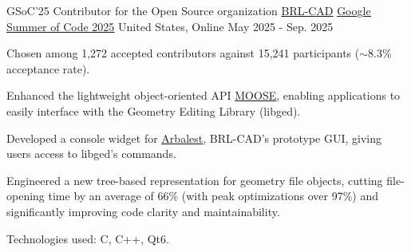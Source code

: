 

\begin{cventries}

  \cventry
    {GSoC'25 Contributor for the Open Source organization \underline{\href{https://github.com/BRL-CAD/brlcad}{BRL-CAD}}} %
    {\underline{\href{https://summerofcode.withgoogle.com/programs/2025/projects/25f08iuM}{Google Summer of Code 2025}}} %
    {United States, Online} %
    {May 2025 - Sep. 2025} %
    {
      \begin{cvitems} %
        \item {Chosen among 1,272 accepted contributors against 15,241 participants ($\sim$8.3\% acceptance rate).}
        \item {Enhanced the lightweight object-oriented API \underline{\href{https://github.com/BRL-CAD/MOOSE}{MOOSE}}, enabling applications to easily interface with the Geometry Editing Library (libged).}
        \item {Developed a console widget for \underline{\href{https://github.com/BRL-CAD/arbalest}{Arbalest}}, BRL-CAD's prototype GUI, giving users access to libged's commands.}
        \item {Engineered a new tree-based representation for geometry file objects, cutting file-opening time by an average of 66\% (with peak optimizations over 97\%) and significantly improving code clarity and maintainability.}
        \item {Technologies used: C, C++, Qt6.}
      \end{cvitems}
    }

\end{cventries}
